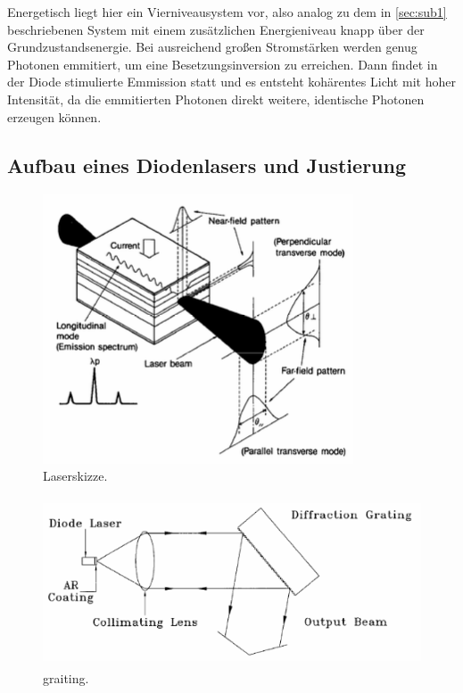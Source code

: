 Energetisch liegt hier ein Vierniveausystem vor, also analog zu dem in \autoref{sec:sub1} beschriebenen System mit einem
zusätzlichen Energieniveau knapp über der Grundzustandsenergie. Bei ausreichend großen Stromstärken werden genug Photonen emmitiert, um eine Besetzungsinversion
zu erreichen. Dann findet in der Diode stimulierte Emmission statt und es entsteht kohärentes Licht mit hoher Intensität, da die
emmitierten Photonen direkt weitere, identische Photonen erzeugen können.

\subsection{Aufbau eines Diodenlasers und Justierung}

\begin{figure}[H]
    \centering
    \includegraphics[height=8cm]{content/pics/laser.png}
    \caption{Laserskizze. \cite{V60}}
    \label{fig:laser}
\end{figure}

\begin{figure}[H]
    \centering
    \includegraphics[height=5cm]{content/pics/graiting.png}
    \caption{graiting. \cite{V60}}
    \label{fig:graiting}
\end{figure}

